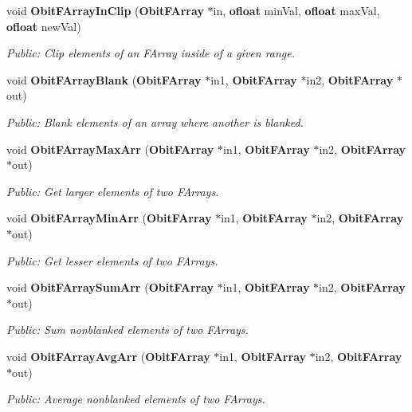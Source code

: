 \begin{CompactItemize}
void {\bf Obit\-FArray\-In\-Clip} ({\bf Obit\-FArray} $\ast$in, {\bf ofloat} min\-Val, {\bf ofloat} max\-Val, {\bf ofloat} new\-Val)
\begin{CompactList}\small\item\em Public: Clip elements of an FArray inside of a given range. \item\end{CompactList}\item 
void {\bf Obit\-FArray\-Blank} ({\bf Obit\-FArray} $\ast$in1, {\bf Obit\-FArray} $\ast$in2, {\bf Obit\-FArray} $\ast$out)
\begin{CompactList}\small\item\em Public: Blank elements of an array where another is blanked. \item\end{CompactList}\item 
void {\bf Obit\-FArray\-Max\-Arr} ({\bf Obit\-FArray} $\ast$in1, {\bf Obit\-FArray} $\ast$in2, {\bf Obit\-FArray} $\ast$out)
\begin{CompactList}\small\item\em Public: Get larger elements of two FArrays. \item\end{CompactList}\item 
void {\bf Obit\-FArray\-Min\-Arr} ({\bf Obit\-FArray} $\ast$in1, {\bf Obit\-FArray} $\ast$in2, {\bf Obit\-FArray} $\ast$out)
\begin{CompactList}\small\item\em Public: Get lesser elements of two FArrays. \item\end{CompactList}\item 
void {\bf Obit\-FArray\-Sum\-Arr} ({\bf Obit\-FArray} $\ast$in1, {\bf Obit\-FArray} $\ast$in2, {\bf Obit\-FArray} $\ast$out)
\begin{CompactList}\small\item\em Public: Sum nonblanked elements of two FArrays. \item\end{CompactList}\item 
void {\bf Obit\-FArray\-Avg\-Arr} ({\bf Obit\-FArray} $\ast$in1, {\bf Obit\-FArray} $\ast$in2, {\bf Obit\-FArray} $\ast$out)
\begin{CompactList}\small\item\em Public: Average nonblanked elements of two FArrays. \item\end{CompactList}\item 

\end{CompactItemize}
